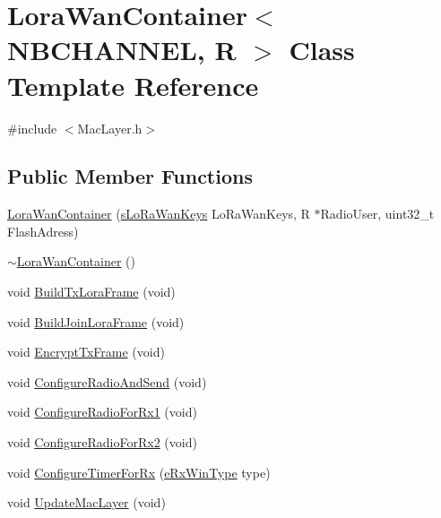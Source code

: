 \hypertarget{class_lora_wan_container}{}\section{Lora\+Wan\+Container$<$ N\+B\+C\+H\+A\+N\+N\+EL, R $>$ Class Template Reference}
\label{class_lora_wan_container}


{\ttfamily \#include $<$Mac\+Layer.\+h$>$}

\subsection*{Public Member Functions}
\begin{DoxyCompactItemize}
\item 
\mbox{\hyperlink{class_lora_wan_container_a44404ff31803a6c55ffc152c023a7db8}{Lora\+Wan\+Container}} (\mbox{\hyperlink{structs_lo_ra_wan_keys}{s\+Lo\+Ra\+Wan\+Keys}} Lo\+Ra\+Wan\+Keys, R $\ast$Radio\+User, uint32\+\_\+t Flash\+Adress)
\item 
\mbox{\hyperlink{class_lora_wan_container_ae1add5f5a0620c3d513737e2e7241575}{$\sim$\+Lora\+Wan\+Container}} ()
\item 
void \mbox{\hyperlink{class_lora_wan_container_a6f0a9f6cddbd54a1fc5dd4c6de790d88}{Build\+Tx\+Lora\+Frame}} (void)
\item 
void \mbox{\hyperlink{class_lora_wan_container_a6ae2e50f7bc0eb014745ac1e2f48d0af}{Build\+Join\+Lora\+Frame}} (void)
\item 
void \mbox{\hyperlink{class_lora_wan_container_ae9bc11031f33b9bc4928b021a6a34cbd}{Encrypt\+Tx\+Frame}} (void)
\item 
void \mbox{\hyperlink{class_lora_wan_container_ac9a6098c71b551eccdea9b1f29f50c96}{Configure\+Radio\+And\+Send}} (void)
\item 
void \mbox{\hyperlink{class_lora_wan_container_a5c438e86f462a461cbc244054a2c27bb}{Configure\+Radio\+For\+Rx1}} (void)
\item 
void \mbox{\hyperlink{class_lora_wan_container_a9f189640ccae4f4b1e11c4671c88b6c0}{Configure\+Radio\+For\+Rx2}} (void)
\item 
void \mbox{\hyperlink{class_lora_wan_container_a077db278808a15326893610820e26b22}{Configure\+Timer\+For\+Rx}} (\mbox{\hyperlink{_define_8h_ab894a4c21b8aae9e9c68d8c426a66956}{e\+Rx\+Win\+Type}} type)
\item 
void \mbox{\hyperlink{class_lora_wan_container_a99e0d080f7a2bd65252d688e2a4befa1}{Update\+Mac\+Layer}} (void)

\end{DoxyCompactItemize}
